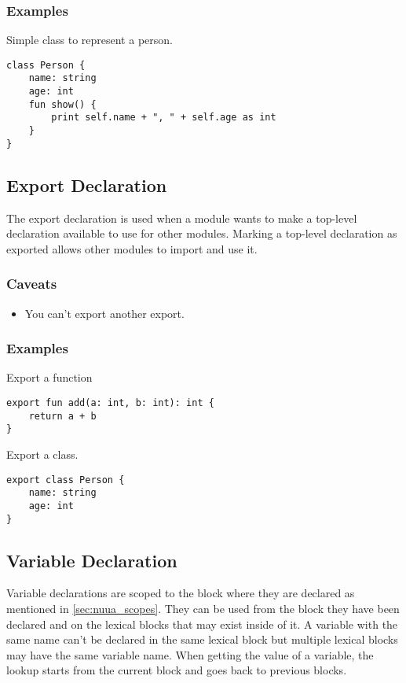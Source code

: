 \subsubsection{Examples}

Simple class to represent a person.
\begin{verbatim}
class Person {
    name: string
    age: int
    fun show() {
        print self.name + ", " + self.age as int
    }
}
\end{verbatim}

\subsection{Export Declaration}

The export declaration is used when a module wants to make a top-level declaration available to use for other
modules. Marking a top-level declaration as exported allows other modules to import and use it.

\subsubsection{Caveats}

\begin{itemize}
    \item You can't export another export.
\end{itemize}

\subsubsection{Examples}

Export a function
\begin{verbatim}
export fun add(a: int, b: int): int {
    return a + b
}
\end{verbatim}
Export a class.
\begin{verbatim}
export class Person {
    name: string
    age: int
}
\end{verbatim}

\subsection{Variable Declaration}

Variable declarations are scoped to the block where they are declared as mentioned in \autoref{sec:nuua_scopes}.
They can be used from the block they have been declared and on the lexical blocks that may exist inside of it.
A variable with the same name can't be declared in the same lexical block but multiple lexical
blocks may have the same variable name. When getting the value of a variable, the lookup starts from the current block and goes back to previous blocks.

